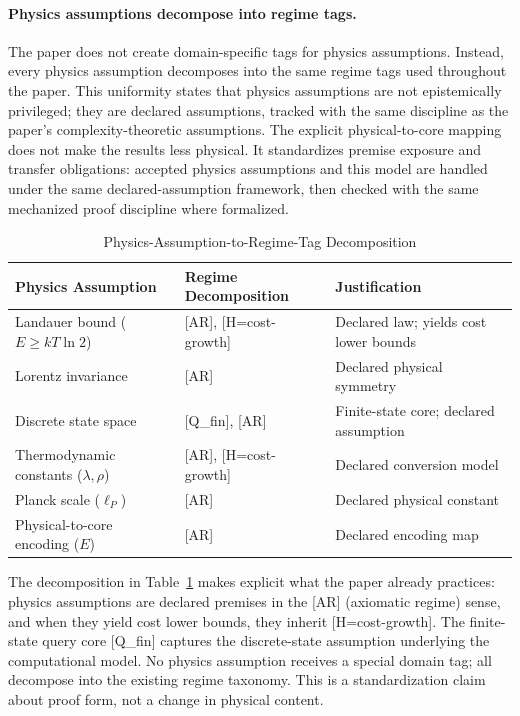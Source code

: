 \paragraph{Physics assumptions decompose into regime tags.}
The paper does not create domain-specific tags for physics assumptions. Instead, every physics assumption decomposes into the same regime tags used throughout the paper. This uniformity states that physics assumptions are not epistemically privileged; they are declared assumptions, tracked with the same discipline as the paper's complexity-theoretic assumptions.
The explicit physical-to-core mapping does not make the results less physical. It standardizes premise exposure and transfer obligations: accepted physics assumptions and this model are handled under the same declared-assumption framework, then checked with the same mechanized proof discipline where formalized.

\begin{table}[h]
\centering
\caption{Physics-Assumption-to-Regime-Tag Decomposition}
\label{tab:physics-regime-decomposition}
\begin{tabular}{@{}lll@{}}
\toprule
\textbf{Physics Assumption} & \textbf{Regime Decomposition} & \textbf{Justification} \\
\midrule
Landauer bound ($E \ge kT\ln 2$) & [AR], [H=cost-growth] & Declared law; yields cost lower bounds \\
Lorentz invariance & [AR] & Declared physical symmetry \\
Discrete state space & [Q\_fin], [AR] & Finite-state core; declared assumption \\
Thermodynamic constants ($\lambda, \rho$) & [AR], [H=cost-growth] & Declared conversion model \\
Planck scale ($\ell_P$) & [AR] & Declared physical constant \\
Physical-to-core encoding ($E$) & [AR] & Declared encoding map \\
\bottomrule
\end{tabular}
\end{table}

The decomposition in Table~\ref{tab:physics-regime-decomposition} makes explicit what the paper already practices: physics assumptions are declared premises in the [AR] (axiomatic regime) sense, and when they yield cost lower bounds, they inherit [H=cost-growth]. The finite-state query core [Q\_fin] captures the discrete-state assumption underlying the computational model. No physics assumption receives a special domain tag; all decompose into the existing regime taxonomy. This is a standardization claim about proof form, not a change in physical content.

